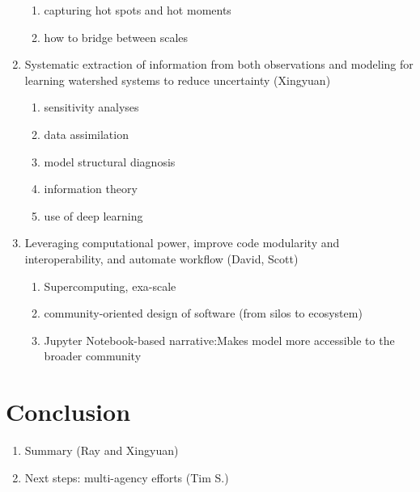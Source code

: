 \documentclass[preprint,review, 12pt]{elsarticle}
\begin{document}
\begin{enumerate}
\begin{enumerate}
            \item capturing hot spots and hot moments
            \item how to bridge between scales
        \end{enumerate}
    \item Systematic extraction of information from both observations and modeling for learning watershed systems to reduce uncertainty (Xingyuan)
        \begin{enumerate}
            \item sensitivity analyses
            \item data assimilation
            \item model structural diagnosis
            \item information theory
            \item use of deep learning 
        \end{enumerate}
    \item Leveraging computational power, improve code modularity and interoperability, and automate workflow (David, Scott)
        \begin{enumerate}
            \item Supercomputing, exa-scale
            \item community-oriented design of software (from silos to ecosystem)
            \item Jupyter Notebook-based narrative:Makes model more accessible to the broader community
        \end{enumerate}
\end{enumerate}   


\section{Conclusion}
\begin{enumerate} 
    \item Summary (Ray and Xingyuan)
    \item Next steps: multi-agency efforts (Tim S.)
 \end{enumerate}




%








\end{document}

